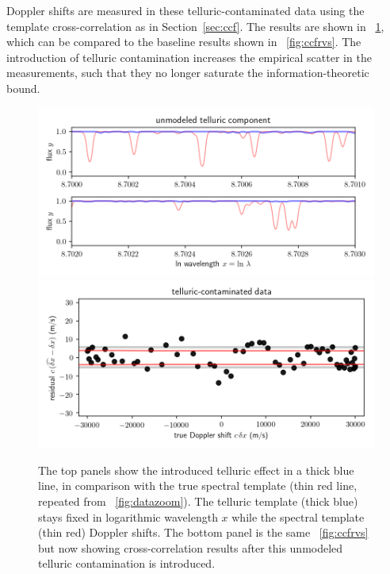 \documentclass[modern]{aastex631}
\newcommand{\sectionname}{Section}
\newcommand{\secref}[1]{\sectionname~\ref{#1}}
\newcommand{\figref}[1]{\figurename~\ref{#1}}
\begin{document}
Doppler shifts are measured in these telluric-contaminated data using the template cross-correlation as in \secref{sec:ccf}.
The results are shown in  \figref{fig:telluric}, which can be compared to the baseline results shown in \figref{fig:ccfrvs}.
The introduction of telluric contamination increases the empirical scatter in the measurements, such that they no longer saturate the information-theoretic bound.

\begin{figure}[tp]
  \begin{mdframed}
    \begin{center}
    \includegraphics[width=\textwidth]{../notebook/telluricmodel.png}
    \includegraphics[width=\textwidth]{../notebook/telluric.png}
    \end{center}
    \caption{The top panels show the introduced telluric effect in a thick blue line, in comparison with the true spectral template (thin red line, repeated from \figref{fig:datazoom}). The telluric template (thick blue) stays fixed in logarithmic wavelength $x$ while the spectral template (thin red) Doppler shifts. The bottom panel is the same \figref{fig:ccfrvs} but now showing cross-correlation results after this unmodeled telluric contamination is introduced.\label{fig:telluric}}
  \end{mdframed}
\end{figure}
\end{document}
